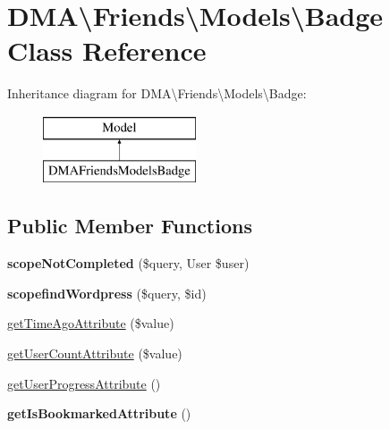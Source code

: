 \hypertarget{classDMA_1_1Friends_1_1Models_1_1Badge}{\section{D\+M\+A\textbackslash{}Friends\textbackslash{}Models\textbackslash{}Badge Class Reference}
\label{classDMA_1_1Friends_1_1Models_1_1Badge}
}
Inheritance diagram for D\+M\+A\textbackslash{}Friends\textbackslash{}Models\textbackslash{}Badge\+:\begin{figure}[H]
\begin{center}
\leavevmode
\includegraphics[height=2.000000cm]{df/d98/classDMA_1_1Friends_1_1Models_1_1Badge}
\end{center}
\end{figure}
\subsection*{Public Member Functions}
\begin{DoxyCompactItemize}
\item 
\hypertarget{classDMA_1_1Friends_1_1Models_1_1Badge_a65fc600bfefbedc8d7393ec86c848a51}{{\bfseries scope\+Not\+Completed} (\$query, User \$user)}\label{classDMA_1_1Friends_1_1Models_1_1Badge_a65fc600bfefbedc8d7393ec86c848a51}

\item 
\hypertarget{classDMA_1_1Friends_1_1Models_1_1Badge_a5ebdc91135362ca2b0225fdb0c965127}{{\bfseries scopefind\+Wordpress} (\$query, \$id)}\label{classDMA_1_1Friends_1_1Models_1_1Badge_a5ebdc91135362ca2b0225fdb0c965127}

\item 
\hyperlink{classDMA_1_1Friends_1_1Models_1_1Badge_a628b0da2969e586837ad98fecf12ee71}{get\+Time\+Ago\+Attribute} (\$value)
\item 
\hyperlink{classDMA_1_1Friends_1_1Models_1_1Badge_a5e5972aaa2bf8b8458bd6ddff8ebc576}{get\+User\+Count\+Attribute} (\$value)
\item 
\hyperlink{classDMA_1_1Friends_1_1Models_1_1Badge_a3deecf172b12b43e2f0c0bb7c15a00c3}{get\+User\+Progress\+Attribute} ()
\item 
\hypertarget{classDMA_1_1Friends_1_1Models_1_1Badge_a218e9babbcf0db06e0a83e1079e858b2}{{\bfseries get\+Is\+Bookmarked\+Attribute} ()}\label{classDMA_1_1Friends_1_1Models_1_1Badge_a218e9babbcf0db06e0a83e1079e858b2}

\end{DoxyCompactItemize}

